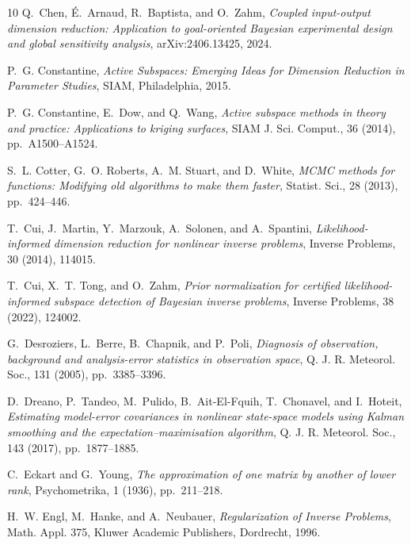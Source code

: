 \begin{thebibliography}{10}
{\sc Q.~Chen, \'E.~Arnaud, R.~Baptista, and O.~Zahm}, {\em Coupled input-output dimension reduction: Application to goal-oriented Bayesian experimental design and global sensitivity analysis}, arXiv:2406.13425, 2024.

{\sc P.~G. Constantine}, {\em Active Subspaces: Emerging Ideas for Dimension Reduction in Parameter Studies}, SIAM, Philadelphia, 2015.

{\sc P.~G. Constantine, E.~Dow, and Q.~Wang}, {\em Active subspace methods in theory and practice: Applications to kriging surfaces}, SIAM J. Sci. Comput., 36 (2014), pp.~A1500--A1524.

{\sc S.~L. Cotter, G.~O. Roberts, A.~M. Stuart, and D.~White}, {\em MCMC methods for functions: Modifying old algorithms to make them faster}, Statist. Sci., 28 (2013), pp.~424--446.

{\sc T.~Cui, J.~Martin, Y.~Marzouk, A.~Solonen, and A.~Spantini}, {\em Likelihood-informed dimension reduction for nonlinear inverse problems}, Inverse Problems, 30 (2014), 114015.

{\sc T.~Cui, X.~T. Tong, and O.~Zahm}, {\em Prior normalization for certified likelihood-informed subspace detection of Bayesian inverse problems}, Inverse Problems, 38 (2022), 124002.

{\sc G.~Desroziers, L.~Berre, B.~Chapnik, and P.~Poli}, {\em Diagnosis of observation, background and analysis-error statistics in observation space}, Q. J. R. Meteorol. Soc., 131 (2005), pp.~3385--3396.

{\sc D.~Dreano, P.~Tandeo, M.~Pulido, B.~Ait-El-Fquih, T.~Chonavel, and I.~Hoteit}, {\em Estimating model-error covariances in nonlinear state-space models using Kalman smoothing and the expectation--maximisation algorithm}, Q. J. R. Meteorol. Soc., 143 (2017), pp.~1877--1885.

{\sc C.~Eckart and G.~Young}, {\em The approximation of one matrix by another of lower rank}, Psychometrika, 1 (1936), pp.~211--218.

{\sc H.~W. Engl, M.~Hanke, and A.~Neubauer}, {\em Regularization of Inverse Problems}, Math. Appl. 375, Kluwer Academic Publishers, Dordrecht, 1996.


\end{thebibliography}

